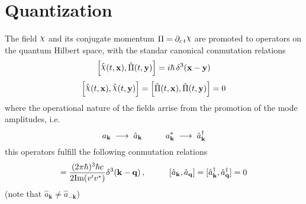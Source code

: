 \section{Quantization}
The field $\rchi$ and its conjugate momentum $\Pi=\partial_{c\,t} \rchi$ are promoted to operators on the quantum Hilbert space, with the standar canonical conmutation relations
\begin{equation}
	\left[\hat{\rchi}(t,\mathbf{x}),\hat{\Pi}(t,\mathbf{y})\right]=i\hbar \,\delta^3(\mathbf{x}-\mathbf{y})
\end{equation}
\begin{equation}
	\Big[\hat{\rchi}(t,\mathbf{x}),\hat{\rchi}(t,\mathbf{y})\Big]=\left[\hat{\Pi}(t,\mathbf{x}),\hat{\Pi}(t,\mathbf{y})\right]=0
\end{equation}
where the operational nature of the fields arrise from the promotion of the mode amplitudes, i.e.
\begin{equation}
	a_\mathbf{k}\;\longrightarrow\;\hat{a}_\mathbf{k}\hspace{1.0cm}a_\mathbf{k}^*\;\longrightarrow\;\hat{a}_\mathbf{k}^\dagger
\end{equation}
this operators fulfill the following conmutation relations
\begin{equation}
	[\hat{a}_\mathbf{k},\hat{a}_\mathbf{q}^\dagger]=\frac{(2\pi\hbar)^3\hbar c}{2\text{Im}(v'v^*)}\delta^3(\mathbf{k}-\mathbf{q})\,,\hspace{1.0cm}[\hat{a}_\mathbf{k},\hat{a}_\mathbf{q}]=[\hat{a}_\mathbf{k}^\dagger,\hat{a}_\mathbf{q}^\dagger]=0
\end{equation}
(note that $\hat{a}_\mathbf{k}\not=\hat{a}_{-\mathbf{k}}$)

